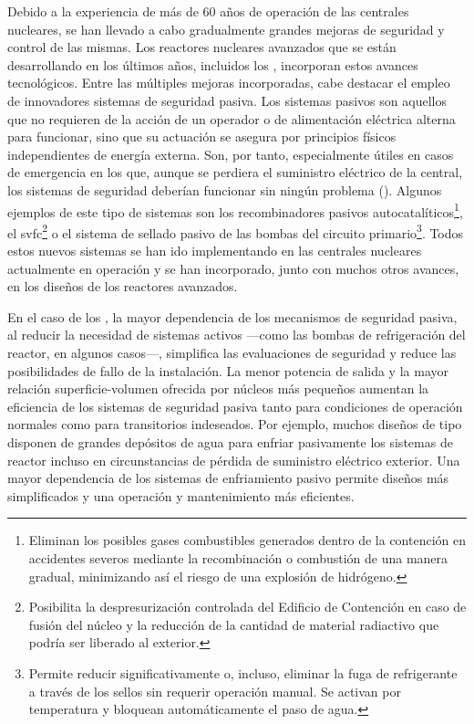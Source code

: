 Debido a la experiencia de más de 60 años de operación de las centrales nucleares, se han llevado a cabo gradualmente grandes mejoras de seguridad y control de las mismas. Los reactores nucleares avanzados que se están desarrollando en los últimos años, incluidos los , incorporan estos avances tecnológicos. Entre las múltiples mejoras incorporadas, cabe destacar el empleo de innovadores sistemas de seguridad pasiva. Los sistemas pasivos son aquellos que no requieren de la acción de un operador o de alimentación eléctrica alterna para funcionar, sino que su actuación se asegura por principios físicos independientes de energía externa. Son, por tanto, especialmente útiles en casos de emergencia en los que, aunque se perdiera el suministro eléctrico de la central, los sistemas de seguridad deberían funcionar sin ningún problema (\cite{glosario_seguridad_oiea}). Algunos ejemplos de este tipo de sistemas son los r\gls{ecombinadores pasivos} autocatalíticos\footnote{Eliminan los posibles gases combustibles generados dentro de la contención en accidentes severos mediante la recombinación o combustión de una manera gradual, minimizando así el riesgo de una explosión de hidrógeno.}, el \acrfull{svfc}\footnote{Posibilita la despresurización controlada del Edificio de Contención en caso de fusión del núcleo y la reducción de la cantidad de material radiactivo que podría ser liberado al exterior.} o el sistema de sellado pasivo de las bombas del circuito primario\footnote{Permite reducir significativamente o, incluso, eliminar la fuga de refrigerante a través de los sellos sin requerir operación manual. Se activan por temperatura y bloquean automáticamente
el paso de agua.}. Todos estos nuevos sistemas se han ido implementando en las centrales nucleares actualmente en operación y se han incorporado, junto con muchos otros avances, en los diseños de los reactores avanzados.

En el caso de los , la mayor dependencia de los mecanismos de seguridad pasiva, al reducir la necesidad de sistemas activos ---como las bombas de refrigeración del reactor, en algunos casos---, simplifica las evaluaciones de seguridad y reduce las posibilidades de fallo de la instalación. La menor potencia de salida y la mayor relación superficie-volumen ofrecida por núcleos más pequeños aumentan la eficiencia de los sistemas de seguridad pasiva tanto para condiciones de operación normales como para transitorios indeseados. Por ejemplo, muchos diseños de tipo  disponen de grandes depósitos de agua para enfriar pasivamente los sistemas de reactor incluso en circunstancias de pérdida de suministro eléctrico exterior. Una mayor dependencia de los sistemas de enfriamiento pasivo permite diseños más simplificados y una operación y mantenimiento más eficientes. 

